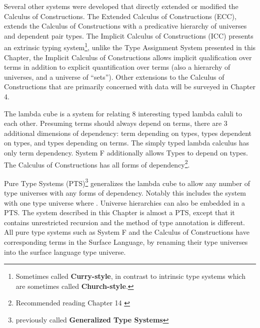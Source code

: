 Several other systems were developed that directly extended or modified the Calculus of Constructions.
The Extended Calculus of Constructions (\ac{ECC})\cite{luo1990extended,luo1994computation}, extends the Calculus of Constructions with a predicative hierarchy of universes and dependent pair types.
The Implicit Calculus of Constructions (\ac{ICC})\cite{10.1007/3-540-45413-6_27,10.1007/978-3-540-78499-9_26} presents an extrinsic typing system\footnote{
 Sometimes called \textbf{Curry-style}, in contrast to intrinsic type systems which are sometimes called \textbf{Church-style}.
 }, unlike the Type Assignment System presented in this Chapter, the Implicit Calculus of Constructions allows implicit qualification over terms in addition to explicit quantification over terms (also a hierarchy of universes, and a universe of ``sets'').
Other extensions to the Calculus of Constructions that are primarily concerned with data will be surveyed in Chapter 4.
 
The lambda cube is a system for relating 8 interesting typed lambda caluli to each other.
Presuming terms should always depend on terms, there are 3 additional dimensions of dependency: term depending on types, types dependent on types, and types depending on terms.
The simply typed lambda calculus has only term dependency.
System F additionally allows Types to depend on types.
The Calculus of Constructions has all forms of dependency\footnote{Recommended reading Chapter 14 \cite{sorensen2006lectures}}.
 
Pure Type Systems (\ac{PTS})\footnote{previously called \textbf{Generalized Type Systems}} generalizes the lambda cube to allow any number of type universes with any forms of dependency.
Notably this includes the system with one type universe where \tit{}.
Universe hierarchies can also be embedded in a \ac{PTS}.
The system described in this Chapter is almost a \ac{PTS}, except that it contains unrestricted recursion and the method of type annotation is different.
All pure type systems such as System F and the Calculus of Constructions have corresponding terms in the Surface Language, by renaming their type universes into the surface language type universe.
 
 

